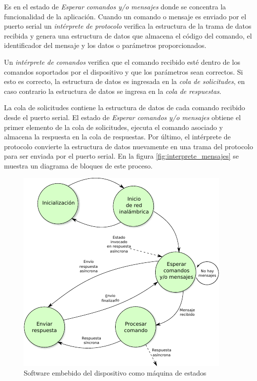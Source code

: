 Es en el estado de \textit{Esperar comandos y/o mensajes} donde se concentra la funcionalidad de la aplicación. Cuando un comando o mensaje es enviado por el puerto serial un \textit{intérprete de protocolo} verifica la estructura de la trama de datos recibida y genera una estructura de datos que almacena el código del comando, el identificador del mensaje y los datos o parámetros proporcionados. 

Un \textit{intérprete de comandos} verifica que el comando recibido esté dentro de los comandos soportados por el dispositivo y que los parámetros sean correctos. Si esto es correcto, la estructura de datos es ingresada en la \textit{cola de solicitudes}, en caso contrario la estructura de datos se ingresa en la \textit{cola de respuestas}. 

La cola de solicitudes contiene la estructura de datos de cada comando recibido desde el puerto serial. El estado de \textit{Esperar comandos y/o mensajes} obtiene el primer elemento de la cola de solicitudes, ejecuta el comando asociado y almacena la respuesta en la cola de respuestas. Por último, el intérprete de protocolo convierte la estructura de datos nuevamente en una trama del protocolo para ser enviada por el puerto serial. En la figura \ref{fig:interprete_mensajes} se muestra un diagrama de bloques de este proceso. 


\begin{figure}
	\centering
	\includegraphics[scale=1.2]{capitulo_3_imgs/app_sd.pdf}
	\caption{Software embebido del dispositivo como máquina de estados}
	\label{fig:maquina_estados_sd}
\end{figure}


